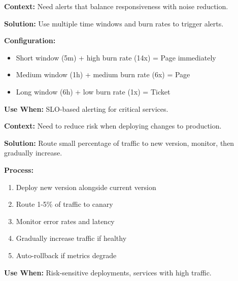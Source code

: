 \documentclass[11pt,letterpaper]{article}
\begin{document}
\begin{patternbox}
\textbf{Context:} Need alerts that balance responsiveness with noise reduction.

\textbf{Solution:} Use multiple time windows and burn rates to trigger alerts.

\textbf{Configuration:}
\begin{itemize}[nosep]
    \item Short window (5m) + high burn rate (14x) = Page immediately
    \item Medium window (1h) + medium burn rate (6x) = Page
    \item Long window (6h) + low burn rate (1x) = Ticket
\end{itemize}

\textbf{Use When:} SLO-based alerting for critical services.
\end{patternbox}

\begin{patternbox}
\textbf{Context:} Need to reduce risk when deploying changes to production.

\textbf{Solution:} Route small percentage of traffic to new version, monitor, then gradually increase.

\textbf{Process:}
\begin{enumerate}[nosep]
    \item Deploy new version alongside current version
    \item Route 1-5\% of traffic to canary
    \item Monitor error rates and latency
    \item Gradually increase traffic if healthy
    \item Auto-rollback if metrics degrade
\end{enumerate}

\textbf{Use When:} Risk-sensitive deployments, services with high traffic.
\end{patternbox}
\end{document}
